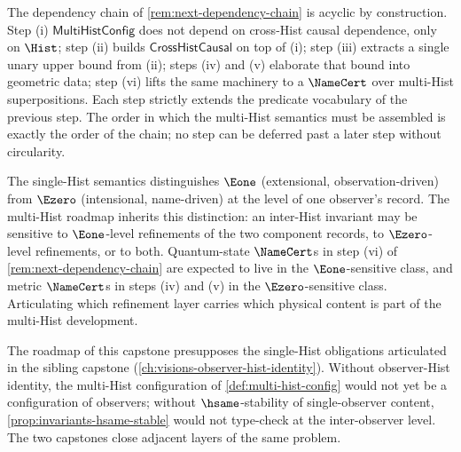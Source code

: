 \begin{remark}
\label{rem:chain-acyclic}
The dependency chain of \autoref{rem:next-dependency-chain} is acyclic by construction. Step (i) \(\mathsf{MultiHistConfig}\) does not depend on cross-Hist causal dependence, only on \(\Hist\); step (ii) builds \(\mathsf{CrossHistCausal}\) on top of (i); step (iii) extracts a single unary upper bound from (ii); steps (iv) and (v) elaborate that bound into geometric data; step (vi) lifts the same machinery to a \(\NameCert\) over multi-Hist superpositions. Each step strictly extends the predicate vocabulary of the previous step. The order in which the multi-Hist semantics must be assembled is exactly the order of the chain; no step can be deferred past a later step without circularity.
\end{remark}


\begin{remark}
\label{rem:e1-e0-multi-hist}
The single-Hist semantics distinguishes \(\Eone\) (extensional, observation-driven) from \(\Ezero\) (intensional, name-driven) at the level of one observer's record. The multi-Hist roadmap inherits this distinction: an inter-Hist invariant may be sensitive to \(\Eone\)-level refinements of the two component records, to \(\Ezero\)-level refinements, or to both. Quantum-state \(\NameCert\)s in step (vi) of \autoref{rem:next-dependency-chain} are expected to live in the \(\Eone\)-sensitive class, and metric \(\NameCert\)s in steps (iv) and (v) in the \(\Ezero\)-sensitive class. Articulating which refinement layer carries which physical content is part of the multi-Hist development.
\end{remark}

\begin{remark}
\label{rem:single-hist-preconditions}
The roadmap of this capstone presupposes the single-Hist obligations articulated in the sibling capstone (\autoref{ch:visions-observer-hist-identity}). Without observer-Hist identity, the multi-Hist configuration of \autoref{def:multi-hist-config} would not yet be a configuration of observers; without \(\hsame\)-stability of single-observer content, \autoref{prop:invariants-hsame-stable} would not type-check at the inter-observer level. The two capstones close adjacent layers of the same problem.
\end{remark}

